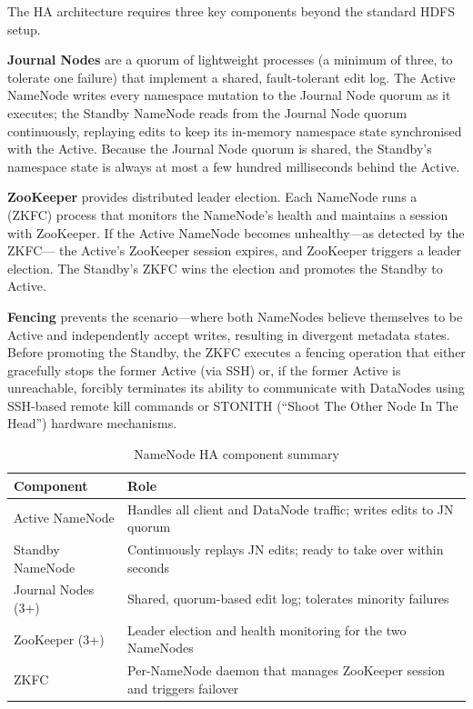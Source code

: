 The HA architecture requires three key components beyond the standard
HDFS setup.

\textbf{Journal Nodes} are a quorum of lightweight processes (a minimum
of three, to tolerate one failure) that implement a shared,
fault-tolerant edit log. The Active NameNode writes every namespace
mutation to the Journal Node quorum as it executes; the Standby
NameNode reads from the Journal Node quorum continuously, replaying
edits to keep its in-memory namespace state synchronised with the
Active. Because the Journal Node quorum is shared, the Standby's
namespace state is always at most a few hundred milliseconds behind
the Active.

\textbf{ZooKeeper} provides distributed leader election. Each NameNode
runs a  (ZKFC) process that
monitors the NameNode's health and maintains a session with ZooKeeper.
If the Active NameNode becomes unhealthy---as detected by the ZKFC---
the Active's ZooKeeper session expires, and ZooKeeper triggers a
leader election. The Standby's ZKFC wins the election and promotes the
Standby to Active.

\textbf{Fencing} prevents the  scenario---where both
NameNodes believe themselves to be Active and independently accept
writes, resulting in divergent metadata states. Before promoting the
Standby, the ZKFC executes a fencing operation that either gracefully
stops the former Active (via SSH) or, if the former Active is
unreachable, forcibly terminates its ability to communicate with
DataNodes using SSH-based remote kill commands or STONITH
(``Shoot The Other Node In The Head'') hardware mechanisms.

\begin{table}[h!t]
\centering
\caption{NameNode HA component summary}
\label{tab:ha-components}
\renewcommand{\arraystretch}{1.4}
\begin{tabular}{L{2.8cm} L{7.8cm}}
\toprule
\textbf{Component} & \textbf{Role} \\
\midrule
Active NameNode    & Handles all client and DataNode traffic; writes edits to JN quorum \\
Standby NameNode   & Continuously replays JN edits; ready to take over within seconds \\
Journal Nodes (3+) & Shared, quorum-based edit log; tolerates minority failures \\
ZooKeeper (3+)     & Leader election and health monitoring for the two NameNodes \\
ZKFC               & Per-NameNode daemon that manages ZooKeeper session and triggers failover \\
\bottomrule
\end{tabular}
\end{table}

